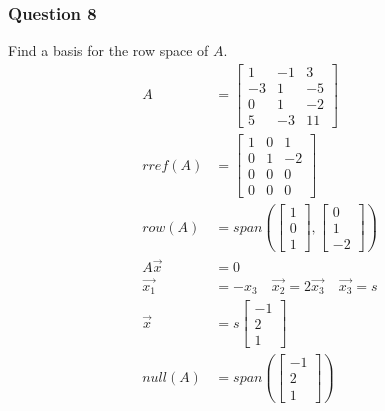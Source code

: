 \documentclass{math}
\begin{document}
\subsubsection*{Question 8}
Find a basis for the row space of \( A \).
\begin{align*}
  A &= \begin{bmatrix}
    1 & -1 & 3 \\
    -3 & 1 & -5 \\
    0 & 1 & -2 \\
    5 & -3 & 11
  \end{bmatrix} \\
  rref(A) &= \begin{bmatrix}
    1 & 0 & 1 \\
    0 & 1 & -2 \\
    0 & 0 & 0 \\
    0 & 0 & 0
  \end{bmatrix} \\
  row(A) &= span\left(
    \begin{bmatrix}1 \\ 0 \\ 1\end{bmatrix},
    \begin{bmatrix}0 \\ 1 \\ -2\end{bmatrix}
  \right) \\
  A\vec{x} &= 0 \\
  \vec{x_1} &= -x_3 \quad \vec{x_2} = 2\vec{x_3} \quad \vec{x_3} = s \\
  \vec{x} &= s\begin{bmatrix}-1 \\ 2 \\ 1\end{bmatrix} \\
  null(A) &= span\left(\begin{bmatrix}-1 \\ 2 \\ 1\end{bmatrix}\right)
\end{align*}
\end{document}
